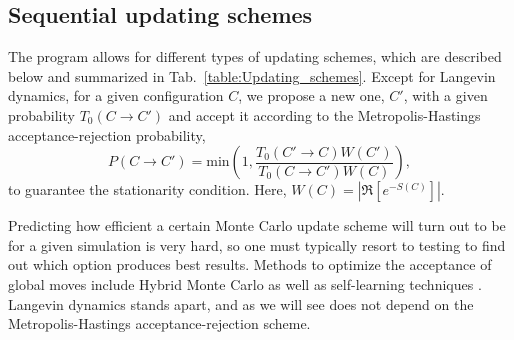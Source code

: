 
\subsection{Sequential updating schemes}\label{sec:updating}
%

The program allows for different types of updating schemes, which are described below and summarized in Tab.~\ref{table:Updating_schemes}.  Except for Langevin dynamics, for a given configuration $C$, we propose a new one, $C'$, with a given probability $T_0(C \rightarrow C')$  and accept it according to   the  Metropolis-Hastings   acceptance-rejection probability, 
\begin{equation}
	P(C \rightarrow C') =  \text{min}  \left( 1, \frac{T_0(C' \rightarrow C) W(C')}{T_0(C \rightarrow C') W(C)} \right),
\end{equation}
to guarantee the stationarity condition.  Here, $ W(C) = \left| \Re \left[ e^{-S(C)} \right] \right| $.

Predicting how efficient a certain Monte Carlo update scheme will turn out to be for a given simulation is very hard, so one must typically resort to testing to find out which option produces best results.   Methods to optimize the acceptance of  global moves include Hybrid Monte Carlo  \cite{Duane85} as well as self-learning techniques  \cite{LiuJ17,Xu17a}.      Langevin dynamics stands apart, and as we will see does not depend on the Metropolis-Hastings   acceptance-rejection scheme.




